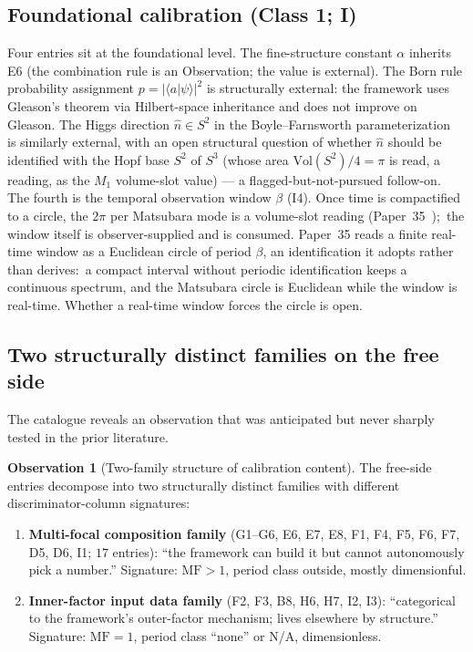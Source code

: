 \documentclass[11pt,a4paper]{article}
\theoremstyle{plain}
\theoremstyle{definition}
\newtheorem{observation}[theorem]{Observation}
\newcommand{\Vol}{\mathrm{Vol}}
\newcommand{\sphere}[1]{S^{#1}}
\begin{document}
\subsection{Foundational calibration (Class 1; I)}
\label{sec:free_foundational}

Four entries sit at the foundational level. The fine-structure constant $\alpha$ inherits E6 (the combination rule is an Observation; the value is external). The Born rule probability assignment $p = |\langle a | \psi \rangle|^2$ is structurally external:  the framework uses Gleason's theorem via Hilbert-space inheritance and does not improve on Gleason. The Higgs direction $\hat n \in \sphere{2}$ in the Boyle--Farnsworth parameterization~\cite{boyle_farnsworth2018} is similarly external, with an open structural question of whether $\hat n$ should be identified with the Hopf base $\sphere{2}$ of $\sphere{3}$ (whose area $\Vol(\sphere{2})/4 = \pi$ is read, a reading, as the $M_1$ volume-slot value) --- a flagged-but-not-pursued follow-on. The fourth is the temporal observation window $\beta$ (I4). Once time is compactified to a circle, the $2\pi$ per Matsubara mode is a volume-slot reading (Paper~35~\cite{paper35});\ the window itself is observer-supplied and is consumed. Paper~35 reads a finite real-time window as a Euclidean circle of period $\beta$, an identification it adopts rather than derives:\ a compact interval without periodic identification keeps a continuous spectrum, and the Matsubara circle is Euclidean while the window is real-time. Whether a real-time window forces the circle is open.

\subsection{Two structurally distinct families on the free side}
\label{sec:free_two_families}

The catalogue reveals an observation that was anticipated but never sharply tested in the prior literature.

\begin{observation}[Two-family structure of calibration content]
\label{obs:two_families}
The free-side entries decompose into two structurally distinct families with different discriminator-column signatures:
\begin{enumerate}
  \item \textbf{Multi-focal composition family} (G1--G6, E6, E7, E8, F1, F4, F5, F6, F7, D5, D6, I1; $17$ entries):  ``the framework can build it but cannot autonomously pick a number.'' Signature:  $\mathrm{MF} > 1$, period class outside, mostly dimensionful.
  \item \textbf{Inner-factor input data family} (F2, F3, B8, H6, H7, I2, I3):  ``categorical to the framework's outer-factor mechanism; lives elsewhere by structure.'' Signature:  $\mathrm{MF} = 1$, period class ``none'' or N/A, dimensionless.
\end{enumerate}
\end{observation}
\end{document}
